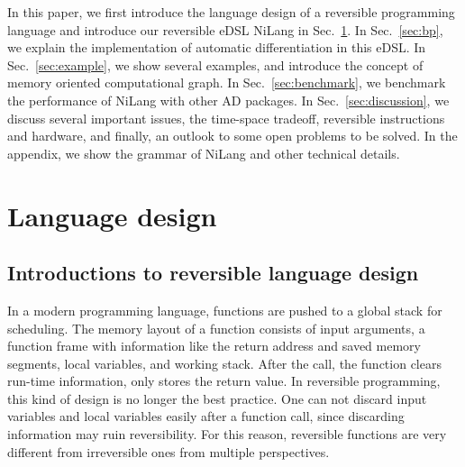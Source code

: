 \documentclass{article}
\newcommand{\<}{\langle}
\renewcommand{\>}{\rangle}
\newcommand{\Sec}[1]{Sec.~\ref{#1}}
\theoremstyle{definition}\newtheorem{definition}{\textit{Definition}}
\begin{document}
    In this paper, we first introduce the language design of a reversible programming language and introduce our reversible eDSL NiLang in \Sec{sec:lang}.
    In \Sec{sec:bp}, we explain the implementation of automatic differentiation in this eDSL.
    In \Sec{sec:example}, we show several examples, and introduce the concept of memory oriented computational graph.
    In \Sec{sec:benchmark}, we benchmark the performance of NiLang with other AD packages.
    In \Sec{sec:discussion}, we discuss several important issues, the time-space  tradeoff, reversible instructions and hardware, and finally, an outlook to some open problems to be solved.
    In the appendix, we show the grammar of NiLang and other technical details.


\section{Language design}\label{sec:lang}

    \subsection{Introductions to reversible language design}
    In a modern programming language, functions are pushed to a global stack for scheduling. The memory layout of a function consists of input arguments, a function frame with information like the return address and saved memory segments, local variables, and working stack. After the call, the function clears run-time information, only stores the return value. In reversible programming, this kind of design is no longer the best practice. One can not discard input variables and local variables easily after a function call, since discarding information may ruin reversibility. For this reason, reversible functions are very different from irreversible ones from multiple perspectives.
\end{document}
